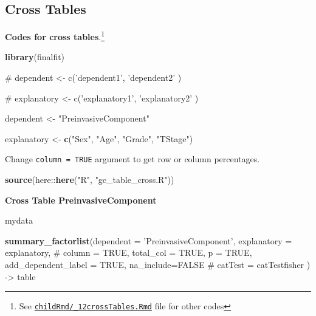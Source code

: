 \documentclass[
]{article}
\newenvironment{Shaded}{\begin{snugshade}}{\end{snugshade}}
\newcommand{\CommentTok}[1]{\textcolor[rgb]{0.54,0.53,0.53}{#1}}
\newcommand{\DataTypeTok}[1]{\textcolor[rgb]{0.00,0.34,0.68}{#1}}
\newcommand{\KeywordTok}[1]{\textcolor[rgb]{0.12,0.11,0.11}{\textbf{#1}}}
\newcommand{\NormalTok}[1]{\textcolor[rgb]{0.12,0.11,0.11}{#1}}
\newcommand{\OperatorTok}[1]{\textcolor[rgb]{0.12,0.11,0.11}{#1}}
\newcommand{\OtherTok}[1]{\textcolor[rgb]{0.00,0.43,0.16}{#1}}
\newcommand{\StringTok}[1]{\textcolor[rgb]{0.75,0.01,0.01}{#1}}
\begin{document}
\newpage
\begin{landscape}

\hypertarget{cross-tables}{%
\subsection{Cross Tables}\label{cross-tables}}

\textbf{Codes for cross tables}.\footnote{See
  \href{https://github.com/sbalci/histopathology-template/blob/master/childRmd/_12crossTables.Rmd}{\texttt{childRmd/\_12crossTables.Rmd}}
  file for other codes}

\begin{Shaded}
\begin{Highlighting}[]
\KeywordTok{library}\NormalTok{(finalfit)}
\end{Highlighting}
\end{Shaded}

\begin{Shaded}
\begin{Highlighting}[]
\CommentTok{# dependent <- c('dependent1', 'dependent2' )}

\CommentTok{# explanatory <- c('explanatory1', 'explanatory2' )}

\NormalTok{dependent <-}\StringTok{ "PreinvasiveComponent"}

\NormalTok{explanatory <-}\StringTok{ }\KeywordTok{c}\NormalTok{(}\StringTok{"Sex"}\NormalTok{, }\StringTok{"Age"}\NormalTok{, }\StringTok{"Grade"}\NormalTok{, }\StringTok{"TStage"}\NormalTok{)}
\end{Highlighting}
\end{Shaded}

Change \texttt{column\ =\ TRUE} argument to get row or column
percentages.

\begin{Shaded}
\begin{Highlighting}[]
\KeywordTok{source}\NormalTok{(here}\OperatorTok{::}\KeywordTok{here}\NormalTok{(}\StringTok{"R"}\NormalTok{, }\StringTok{"gc_table_cross.R"}\NormalTok{))}
\end{Highlighting}
\end{Shaded}

\textbf{Cross Table PreinvasiveComponent}

\begin{Shaded}
\begin{Highlighting}[]
\NormalTok{mydata }\OperatorTok{%>%}
\StringTok{    }\KeywordTok{summary_factorlist}\NormalTok{(}\DataTypeTok{dependent =} \StringTok{'PreinvasiveComponent'}\NormalTok{, }
                       \DataTypeTok{explanatory =}\NormalTok{ explanatory,}
                       \CommentTok{# column = TRUE,}
                       \DataTypeTok{total_col =} \OtherTok{TRUE}\NormalTok{,}
                       \DataTypeTok{p =} \OtherTok{TRUE}\NormalTok{,}
                       \DataTypeTok{add_dependent_label =} \OtherTok{TRUE}\NormalTok{,}
                       \DataTypeTok{na_include=}\OtherTok{FALSE}
                       \CommentTok{# catTest = catTestfisher}
\NormalTok{                       ) ->}\StringTok{ }\NormalTok{table}

}
\end{Highlighting}
\end{Shaded}
\end{landscape}
\end{document}
